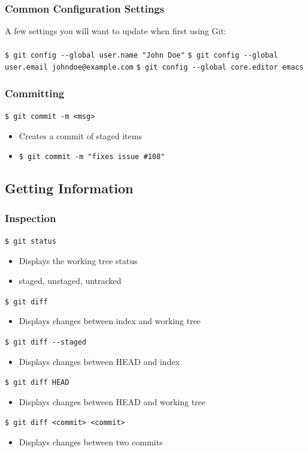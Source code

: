 \documentclass[english,compress]{beamer}
\begin{document}
\begin{frame}[fragile]
    \frametitle{Common Configuration Settings}
	A few settings you will want to update when first using Git:\\ \ \\
	\verb|$ git config --global user.name "John Doe"|
	\verb|$ git config --global user.email johndoe@example.com|
	\verb|$ git config --global core.editor emacs|
\end{frame}

\begin{frame}[fragile]
    \frametitle{Committing}

    \verb|$ git commit -m <msg>|
    \begin{itemize}
        \item Creates a commit of staged items
        \item \verb|$ git commit -m "fixes issue #108"|
    \end{itemize}
\end{frame}

\subsection{Getting Information}
\begin{frame}[fragile]
    \frametitle{Inspection}

    \verb|$ git status|
    \begin{itemize}
        \item Displays the working tree status
        \item staged, unstaged, untracked
    \end{itemize}
    \verb|$ git diff|
    \begin{itemize}
        \item Displays changes between index and working tree
    \end{itemize}
    \verb|$ git diff --staged|
    \begin{itemize}
        \item Displays changes between HEAD and index
    \end{itemize}
    \verb|$ git diff HEAD|
    \begin{itemize}
        \item Displays changes between HEAD and working tree
    \end{itemize}
    \verb|$ git diff <commit> <commit>|
    \begin{itemize}
        \item Displays changes between two commits
    \end{itemize}
\end{frame}
\end{document}
